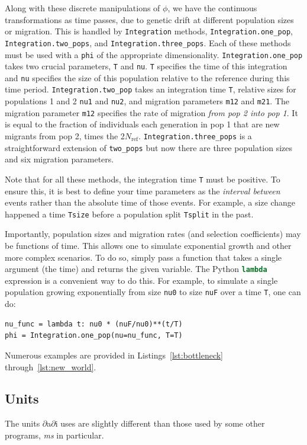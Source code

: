 \documentclass[12pt]{article}
\makeatletter
\newcommand{\dadi}{$\partial$a$\partial$i\xspace}
\newcommand{\Nref}{\ensuremath{N_\text{ref}}\xspace}
\newcommand{\ms}{\emph{ms}\xspace}
\newcommand{\py}[1]{\lstinline[language=Python, showstringspaces=False]@#1@}
\makeatother
\begin{document}
Along with these discrete manipulations of $\phi$, we have the continuous transformations as time passes, due to genetic drift at different population sizes or migration.
This is handled by \py{Integration} methods, \py{Integration.one_pop}, \py{Integration.two_pops}, and \py{Integration.three_pops}.
Each of these methods must be used with a \py{phi} of the appropriate dimensionality.
\py{Integration.one_pop} takes two crucial parameters, \py{T} and \py{nu}.
\py{T} specifies the time of this integration and \py{nu} specifies the size of this population relative to the reference during this time period.
\py{Integration.two_pop} takes an integration time \py{T}, relative sizes for populations 1 and 2 \py{nu1} and \py{nu2}, and migration parameters \py{m12} and \py{m21}.
The migration parameter \py{m12} specifies the rate of migration \emph{from pop 2 into pop 1}.
It is equal to the fraction of individuals each generation in pop 1 that are new migrants from pop 2, times the 2\Nref.
\py{Integration.three_pops} is a straightforward extension of \py{two_pops} but now there are three population sizes and six migration parameters.

Note that for all these methods, the integration time \py{T} must be positive.
To ensure this, it is best to define your time parameters as the \emph{interval between} events rather than the absolute time of those events.
For example, a size change happened a time \py{Tsize} before a population split \py{Tsplit} in the past.

Importantly, population sizes and migration rates (and selection coefficients) may be functions of time.
This allows one to simulate exponential growth and other more complex scenarios.
To do so, simply pass a function that takes a single argument (the time) and returns the given variable.
The Python \py{lambda} expression is a convenient way to do this.
For example, to simulate a single population growing exponentially from size \py{nu0} to size \py{nuF} over a time \py{T}, one can do:
\begin{lstlisting}
nu_func = lambda t: nu0 * (nuF/nu0)**(t/T)
phi = Integration.one_pop(nu=nu_func, T=T)
\end{lstlisting}

Numerous examples are provided in Listings~\ref{lst:bottleneck} through~\ref{lst:new_world}.

\subsection{Units}
The units \dadi uses are slightly different than those used by some other programs, \ms in particular.
\end{document}
